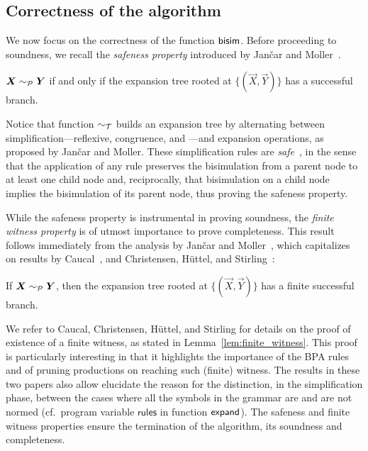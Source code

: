 \subsection{Correctness of the algorithm}

We now focus on the correctness of the function $\mathsf{bisim}$.  Before
proceeding to soundness, we recall the \emph{safeness property}
introduced by Jan{\v{c}}ar and Moller~\cite{janvcar1999techniques}.

\begin{lemma} 
  \label{lem:safeness}
  $\vec X \ProdEquiv \vec Y$ if and only if the expansion tree rooted
  at $\{(\vec X, \vec Y)\}$ has a successful branch.
\end{lemma}

Notice that function $\sim_\mathcal T$ builds an expansion tree by alternating
between simplification---reflexive, congruence, and \BPA---and
expansion operations, as proposed by Jan{\v{c}}ar and Moller.
%
These simplification rules are
\emph{safe}~\cite{janvcar1999techniques}, in the sense that the
application of any rule preserves the bisimulation from a parent node
to at least one child node and, reciprocally, that bisimulation on a
child node implies the bisimulation of its parent node, thus proving
the safeness property.

While the safeness property is instrumental in proving
soundness, the \emph{finite witness property} is of
utmost importance to prove completeness. This result follows
immediately from the analysis by Jan{\v{c}}ar and
Moller~\cite{janvcar1999techniques}, which capitalizes on results by
Caucal~\cite{caucal1986decidabilite}, and Christensen, H{\"{u}}ttel, and
Stirling~\cite{DBLP:journals/iandc/ChristensenHS95}:

\begin{lemma} 
\label{lem:finite_witness}
	If $\vec X \ProdEquiv \vec Y$, then the expansion tree rooted at
	$\{(\vec X, \vec Y)\}$ has a finite successful branch.
\end{lemma}

We refer to Caucal, Christensen, H{\"{u}}ttel, and Stirling for
details on the proof of existence of a finite witness, as stated in
Lemma~\ref{lem:finite_witness}. This proof is particularly interesting in
that it highlights the importance of the BPA rules and of pruning
productions on reaching such (finite) witness. The results in these
two papers also allow elucidate the reason for the distinction, in
the simplification phase, between the cases where all the symbols in
the grammar are and are not normed (cf.~program variable
$\mathsf{rules}$ in function $\mathsf{expand}$).
%
The safeness and finite witness properties ensure the termination of
the algorithm, its soundness and completeness.

